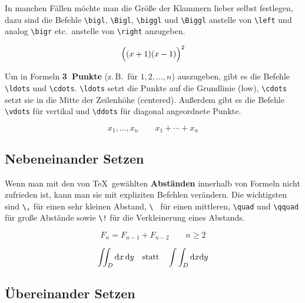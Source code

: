  
In manchen Fällen möchte man die Größe der Klammern lieber
selbst festlegen, dazu sind die Befehle
\lstinline|\bigl|,
\lstinline|\Bigl|,
\lstinline|\biggl| und
\lstinline|\Biggl| anstelle von \lstinline|\left|
und analog \lstinline|\bigr| etc.\ anstelle von \lstinline|\right|
anzugeben.

\begin{LTXexample}
\[
\Bigl( (x+1) (x-1) \Bigr) ^{2}
\]
\end{LTXexample}
 
Um in Formeln \textbf{3~Punkte} (z.\,B.\ für \(1,2,\ldots,n\))
auszugeben, gibt es die Befehle
\lstinline|\ldots| und \lstinline|\cdots|.
\lstinline|\ldots| setzt die Punkte auf die Grundlinie (low),
\lstinline|\cdots| setzt sie in die Mitte der Zeilenhöhe
(centered).
Außerdem gibt es die Befehle
\lstinline|\vdots| für vertikal und
\lstinline|\ddots| für diagonal angeordnete Punkte.

\begin{LTXexample}
\[
x_{1},\ldots,x_{n} \qquad
x_{1}+\cdots+x_{n}
\]
\end{LTXexample}


\subsection{Nebeneinander Setzen}
 
Wenn man mit den von \TeX\ gewählten \textbf{Abständen}
innerhalb von Formeln nicht zufrieden ist, kann man sie mit
expliziten Befehlen verändern. Die wichtigsten sind
\lstinline|\,| für einen sehr kleinen Abstand,
\lstinline|\ | für einen mittleren,
\lstinline|\quad| und \lstinline|\qquad| für große Abstände sowie
\lstinline|\!| für die Verkleinerung eines Abstands.

\begin{LTXexample}
\[
F_{n} = F_{n-1} + F_{n-2}
 \qquad n \ge 2
\]
\end{LTXexample}


\begin{LTXexample}
\[
\int\!\!\!\int_{D} 
\mathrm{d}x\,\mathrm{d}y
\quad \textnormal{statt} \quad
\int\int_{D} 
\mathrm{d}x \mathrm{d}y
\]
\end{LTXexample}



\subsection{Übereinander Setzen}

